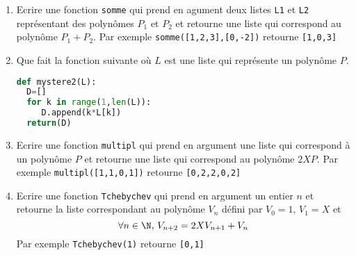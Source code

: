 \documentclass[a4paper, 11pt,reqno]{article}
\begin{document}
\begin{exercice}
\begin{enumerate}
\item Ecrire une fonction \texttt{somme} qui prend en agument deux listes \texttt{L1} et \texttt{L2} représentant des polynômes $P_1$ et $P_2$ et retourne une liste qui correspond au polynôme $P_1+P_2$.
Par exemple \texttt{somme([1,2,3],[0,-2])} retourne \texttt{[1,0,3]}
\item Que fait la fonction suivante où $L$ est une liste qui représente un polynôme $P$. 
\begin{lstlisting}[language=Python]
def mystere2(L):
  D=[]
  for k in range(1,len(L)):
     D.append(k*L[k])
  return(D)
\end{lstlisting}

\item Ecrire une fonction \texttt{multipl} qui prend en argument
une liste qui correspond à un polynôme $P$ et retourne une liste qui correspond au  polynôme $2XP$. Par exemple 
\texttt{multipl([1,1,0,1])} retourne \texttt{[0,2,2,0,2]}
\item Ecrire une fonction \texttt{Tchebychev} qui prend en argument un entier $n$ et retourne la liste correspondant  au polynôme $V_n$ défini par $V_0 =1, \, V_1=X$ et 
$$\forall n\in \N, \, V_{n+2}=2XV_{n+1} +V_n$$
Par exemple \texttt{Tchebychev(1)} retourne \texttt{[0,1]}


\end{enumerate}

\end{exercice}
\end{document}
